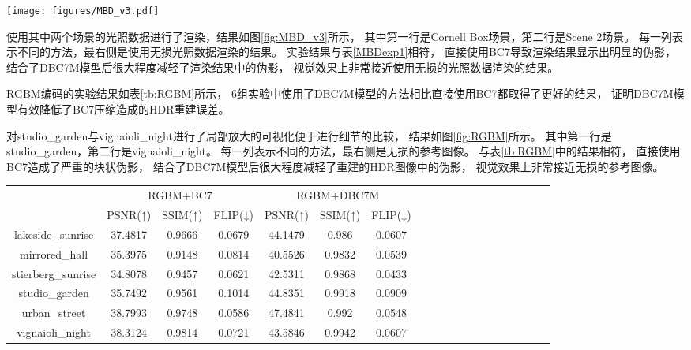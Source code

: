 \begin{figure*}[htbp]
    \centering
    \texttt{[image: figures/MBD\_v3.pdf]}
    \caption{两个场景光照数据的渲染结果}
    \label{fig:MBD_v3} 
\end{figure*}

使用其中两个场景的光照数据进行了渲染，结果如图\ref{fig:MBD_v3}所示，
其中第一行是Cornell Box场景，第二行是Scene 2场景。
每一列表示不同的方法，最右侧是使用无损光照数据渲染的结果。
实验结果与表\ref{MBDexp1}相符，
直接使用BC7导致渲染结果显示出明显的伪影，
结合了DBC7M模型后很大程度减轻了渲染结果中的伪影，
视觉效果上非常接近使用无损的光照数据渲染的结果。

RGBM编码的实验结果如表\ref{tb:RGBM}所示，
6组实验中使用了DBC7M模型的方法相比直接使用BC7都取得了更好的结果，
证明DBC7M模型有效降低了BC7压缩造成的HDR重建误差。

对studio\_garden与vignaioli\_night进行了局部放大的可视化便于进行细节的比较，
结果如图\ref{fig:RGBM}所示。
其中第一行是studio\_garden，第二行是vignaioli\_night。
每一列表示不同的方法，最右侧是无损的参考图像。
与表\ref{tb:RGBM}中的结果相符，
直接使用BC7造成了严重的块状伪影，
结合了DBC7M模型后很大程度减轻了重建的HDR图像中的伪影，
视觉效果上非常接近无损的参考图像。

\begin{table*}[htbp]
    \caption{6个HDR图像上进行的对比实验结果}
    \label{tb:RGBM}
    \begin{center}
    \begin{tabular}{ccccccccccccccccccc}
    \toprule
                    & \multicolumn{3}{c}{RGBM+BC7}  & \multicolumn{3}{c}{RGBM+DBC7M}  \\ 
                    & PSNR(↑)   & SSIM(↑) & FLIP(↓)&PSNR(↑)& SSIM(↑) & FLIP(↓) \\
    \midrule
lakeside\_sunrise    & 37.4817   & 0.9666 & 0.0679 &44.1479&0.986&0.0607 \\
mirrored\_hall       & 35.3975   & 0.9148 & 0.0814 &40.5526&0.9832&0.0539 \\
stierberg\_sunrise   & 34.8078   & 0.9457 & 0.0621 &42.5311&0.9868&0.0433 \\
studio\_garden       & 35.7492   & 0.9561 & 0.1014 &44.8351&0.9918&0.0909 \\
urban\_street        & 38.7993   & 0.9748 & 0.0586 &47.4841&0.992&0.0548 \\
vignaioli\_night     & 38.3124   & 0.9814 & 0.0721 &43.5846&0.9942&0.0607 \\
    \bottomrule
    \end{tabular}
    \end{center}
\end{table*}

